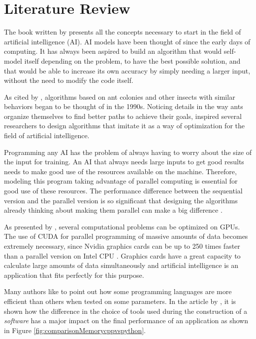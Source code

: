 \section{Literature Review}

The book written by \citeauthor{BookIA} \cite{BookIA} presents all the concepts necessary to start in the field of artificial intelligence (AI).
AI models have been thought of since the early days of computing. It has always been aspired to build an algorithm
that would self-model itself depending on the problem, to have the best possible solution,
and that would be able to increase its own accuracy by simply needing a larger input, without the need to modify
the code itself.

As cited by \citeauthor{AntColonyOptimization} \cite{AntColonyOptimization}, algorithms based on ant colonies
and other insects with similar behaviors began to be thought of in the 1990s.
Noticing details in the way ants organize themselves to find better
paths to achieve their goals, inspired several researchers to design algorithms that imitate it as a way
of optimization for the field of artificial intelligence.

Programming any AI has the problem of always having to worry about the size of the input for training.
An AI that always needs large inputs to get good results needs to make good use of the resources available on the machine.
Therefore, modeling this program taking advantage of parallel computing is essential for good use of these resources.
The performance difference between the sequential version and the parallel version is so significant that designing the algorithms
already thinking about making them parallel can make a big difference \cite{SequentialVSParallel}.

As presented by \citeauthor{ParallelComputingCUDA}, several computational problems can be optimized on GPUs.
The use of CUDA for parallel programming of massive amounts of data becomes extremely necessary, since
Nvidia graphics cards can be up to 250 times faster than a parallel version on Intel CPU \cite{ParallelComputingCUDA}.
Graphics cards have a great capacity to calculate large amounts of data simultaneously and artificial intelligence
is an application that fits perfectly for this purpose.

Many authors like to point out how some programming languages are more efficient than others
when tested on some parameters.
In the article  by \citeauthor{C++vsPython}, it is shown how the difference in the choice of tools
used during the construction of a \emph{software} has a major impact on the final performance of an application as
shown in Figure \ref{fig:comparisonMemorycppvspython}.


